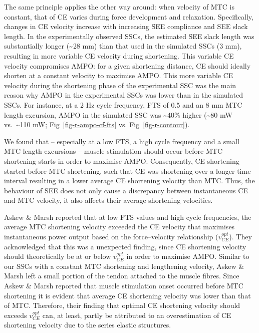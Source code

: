 \documentclass[
  10pt,
  letterpaper,
]{article}
\begin{document}
The same principle applies the other way around: when velocity of MTC is
constant, that of CE varies during force development and relaxation.
Specifically, changes in CE velocity increase with increasing SEE
compliance and SEE slack length. In the experimentally observed SSCs,
the estimated SEE slack length was substantially longer
(\textasciitilde28 mm) than that used in the simulated SSCs (3 mm),
resulting in more variable CE velocity during shortening. This variable
CE velocity compromises AMPO: for a given shortening distance, CE should
ideally shorten at a constant velocity to maximise AMPO. This more
variable CE velocity during the shortening phase of the experimental SSC
was the main reason why AMPO in the experimental SSCs was lower than in
the simulated SSCs. For instance, at a 2 Hz cycle frequency, FTS of 0.5
and an 8 mm MTC length excursion, AMPO in the simulated SSC was
\textasciitilde40\% higher (\textasciitilde80 mW vs.~\textasciitilde110
mW; Fig~\ref{fig-r-ampo-cf-fts} vs. Fig~\ref{fig-r-contour}).

We found that -- especially at a low FTS, a high cycle frequency and a
small MTC length excursions -- muscle stimulation should occur before
MTC shortening starts in order to maximise AMPO. Consequently, CE
shortening started before MTC shortening, such that CE was shortening
over a longer time interval resulting in a lower average CE shortening
velocity than MTC. Thus, the behaviour of SEE does not only cause a
discrepancy between instantaneous CE and MTC velocity, it also affects
their average shortening velocities.

{Askew \& Marsh \citep{askew_optimal_1998}} reported that at low FTS
values and high cycle frequencies, the average MTC shortening velocity
exceeded the CE velocity that maximises instantaneous power output based
on the force--velocity relationship (\(v_{CE}^{opt}\)). They
acknowledged that this was a unexpected finding, since CE shortening
velocity should theoretically be at or below \(v_{CE}^{opt}\) in order
to maximise AMPO. Similar to our SSCs with a constant MTC shortening and
lengthening velocity, {Askew \& Marsh \citep{askew_optimal_1998}} left a
small portion of the tendon attached to the muscle fibres. Since Askew
\& Marsh reported that muscle stimulation onset occurred before MTC
shortening it is evident that average CE shortening velocity was lower
than that of MTC. Therefore, their finding that optimal CE shortening
velocity should exceeds \(v_{CE}^{opt}\) can, at least, partly be
attributed to an overestimation of CE shortening velocity due to the
series elastic structures.
\end{document}
